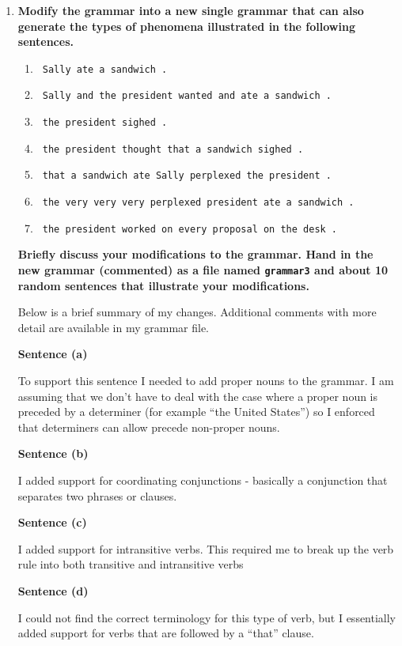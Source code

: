 \documentclass[10pt]{article}
\begin{document}
\begin{enumerate}
\begin{enumerate}
{the fine chief of staff understood the president in the chief of staff .

}

\end{enumerate}
\item {\bf Modify the grammar into a new single grammar that can also generate the types of
  phenomena illustrated in the following sentences.}
\begin{enumerate}
\item \verb| Sally ate a sandwich .|
\item \verb| Sally and the president wanted and ate a sandwich .|
\item \verb| the president sighed .|
\item \verb| the president thought that a sandwich sighed .|
\item \verb| that a sandwich ate Sally perplexed the president .|
\item \verb| the very very very perplexed president ate a sandwich .|
\item \verb| the president worked on every proposal on the desk .|
\end{enumerate}

\noindent
{\bf Briefly discuss your modifications to the grammar. Hand
  in the new grammar (commented) as a file named \verb|grammar3| and about 10
  random sentences that illustrate your modifications.}

Below is a brief summary of my changes. Additional comments with more detail are available in my grammar file.

{\bf Sentence (a)}

To support this sentence I needed to add proper nouns to the grammar. I am assuming that we don't have to deal with the case where a proper noun is preceded by a determiner (for example ``the United States'') so I enforced that determiners can allow precede non-proper nouns.

{\bf Sentence (b)}

I added support for coordinating conjunctions - basically a conjunction that separates two phrases or clauses.

{\bf Sentence (c)}

I added support for intransitive verbs. This required me to break up the verb rule into both transitive and intransitive verbs

{\bf Sentence (d)}

I could not find the correct terminology for this type of verb, but I essentially added support for verbs that are followed by a ``that'' clause.


\end{enumerate}
\end{document}
